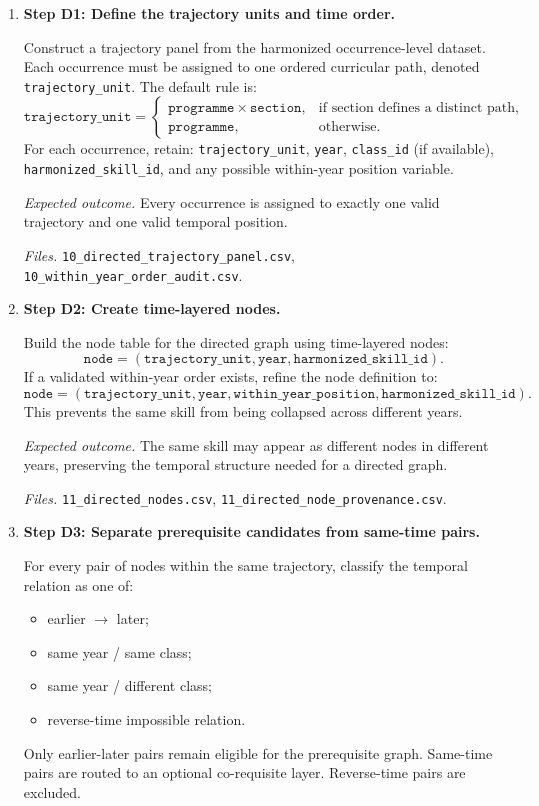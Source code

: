 \begin{enumerate}

    \item \textbf{Step D1: Define the trajectory units and time order.}

    Construct a trajectory panel from the harmonized occurrence-level dataset. Each occurrence
    must be assigned to one ordered curricular path, denoted \texttt{trajectory\_unit}. The default
    rule is:
    \[
    \texttt{trajectory\_unit} =
    \begin{cases}
    \texttt{programme} \times \texttt{section}, & \text{if section defines a distinct path},\\
    \texttt{programme}, & \text{otherwise.}
    \end{cases}
    \]
    For each occurrence, retain:
    \texttt{trajectory\_unit}, \texttt{year}, \texttt{class\_id} (if available),
    \texttt{harmonized\_skill\_id}, and any possible within-year position variable.

    \textit{Expected outcome.}
    Every occurrence is assigned to exactly one valid trajectory and one valid temporal position.

    \textit{Files.}
    \texttt{10\_directed\_trajectory\_panel.csv},
    \texttt{10\_within\_year\_order\_audit.csv}.

    \item \textbf{Step D2: Create time-layered nodes.}

    Build the node table for the directed graph using time-layered nodes:
    \[
    \texttt{node} = (\texttt{trajectory\_unit}, \texttt{year}, \texttt{harmonized\_skill\_id}).
    \]
    If a validated within-year order exists, refine the node definition to:
    \[
    \texttt{node} =
    (\texttt{trajectory\_unit}, \texttt{year}, \texttt{within\_year\_position},
    \texttt{harmonized\_skill\_id}).
    \]
    This prevents the same skill from being collapsed across different years.

    \textit{Expected outcome.}
    The same skill may appear as different nodes in different years, preserving the temporal
    structure needed for a directed graph.

    \textit{Files.}
    \texttt{11\_directed\_nodes.csv},
    \texttt{11\_directed\_node\_provenance.csv}.

    \item \textbf{Step D3: Separate prerequisite candidates from same-time pairs.}

    For every pair of nodes within the same trajectory, classify the temporal relation as one of:
    \begin{itemize}
        \item earlier $\rightarrow$ later;
        \item same year / same class;
        \item same year / different class;
        \item reverse-time impossible relation.
    \end{itemize}
    Only earlier-later pairs remain eligible for the prerequisite graph. Same-time pairs are routed
    to an optional co-requisite layer. Reverse-time pairs are excluded.


\end{enumerate}
